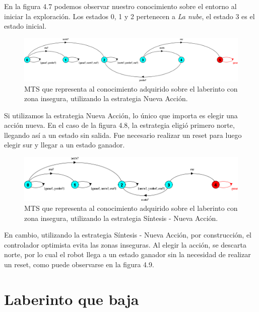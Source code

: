 En la figura 4.7 podemos observar nuestro conocimiento sobre el entorno al iniciar la exploración. Los estados 0, 1 y 2 pertenecen a \textit{La nube}, 
el estado 3 es el estado inicial.

\begin{figure}[H]
	\centering
		\includegraphics[width=1.0\textwidth]{Imagenes/Laberintos/unsafe_nueva_accion.png}
	\caption{MTS que representa al conocimiento adquirido sobre el laberinto con zona insegura, utilizando la estrategia Nueva Acción.}
	\label{fig:unsafe_nueva_accion}
\end{figure}

Si utilizamos la estrategia Nueva Acción, lo único que importa es elegir una acción nueva. En el caso de la figura 4.8, la estrategia eligió primero norte, 
llegando así a un estado sin salida. Fue necesario realizar un reset para luego elegir sur y llegar a un estado ganador.

\begin{figure}[H]
	\centering
		\includegraphics[width=1.0\textwidth]{Imagenes/Laberintos/unsafe_sintesis.png}
	\caption{MTS que representa al conocimiento adquirido sobre el laberinto con zona insegura, utilizando la estrategia Síntesis - Nueva Acción.}
	\label{fig:unsafe_sintesis}
\end{figure}

En cambio, utilizando la estrategia Síntesis - Nueva Acción, por construcción, el controlador optimista evita las zonas inseguras. Al elegir la acción, 
se descarta norte, por lo cual el robot llega a un estado ganador sin la necesidad de realizar un reset, como puede observarse en la figura 4.9.

\clearpage

\section{Laberinto que baja}

